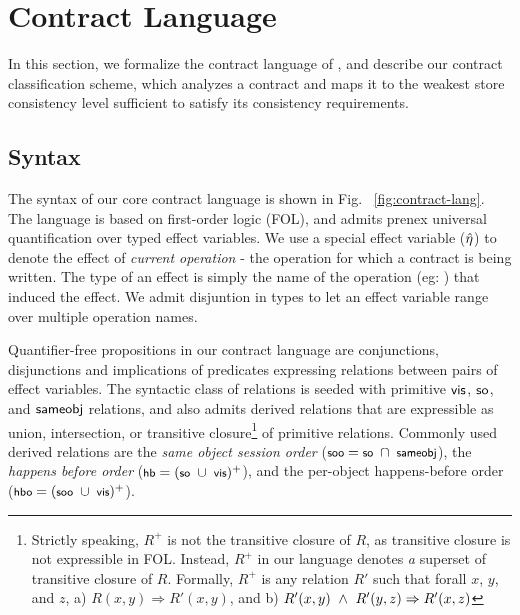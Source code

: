 \section{Contract Language}
\label{sec:contract-lang}



In this section, we formalize the contract language of \name, and describe our
contract classification scheme, which analyzes a contract and maps it to the
weakest store consistency level sufficient to satisfy its consistency
requirements.


\subsection{Syntax}

The syntax of our core contract language is shown in Fig.
~\ref{fig:contract-lang}. The language is based on first-order logic (FOL), and
admits prenex universal quantification over typed effect variables. We use a special
effect variable ($\hat{\eta}$) to denote the effect of \emph{current operation} -
the operation for which a contract is being written. The type of an effect is
simply the name of the operation (eg: ) that induced the
effect. We admit disjuntion in types to let an effect variable range over
multiple operation names.

Quantifier-free propositions in our contract language are conjunctions,
disjunctions and implications of predicates expressing relations between pairs
of effect variables. The syntactic class of relations is seeded with primitive
${\normalfont \textsf{vis}}$, ${\normalfont \textsf{so}}$, and ${\normalfont \textsf{sameobj}}$ relations, and also admits derived relations
that are expressible as union, intersection, or transitive
closure\footnote{Strictly speaking, $R^{+}$ is not the transitive closure of
$R$, as transitive closure is not expressible in FOL. Instead, $R^{+}$ in our
language denotes \emph{a} superset of transitive closure of $R$. Formally,
$R^{+}$ is any relation $R'$ such that forall $x$, $y$, and $z$, a) $R(x,y)
\Rightarrow R'(x,y)$, and b) $R'(x,y) ~\wedge~ R'(y,z) \Rightarrow R'(x,z)$} of
primitive relations. Commonly used derived relations are the \emph{same object
session order} ($\small \sooZ = \soZ ~\cap~ \sameobjZ$), the \emph{happens
before order} ($\small \hbZ = (\soZ ~\cup~ \visZ)^+$), and the per-object
happens-before order ($\small \hboZ = (\sooZ ~\cup~ \visZ)^+$).


